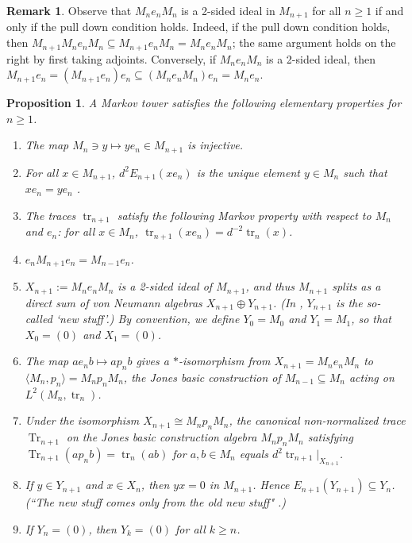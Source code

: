 \documentclass[11pt]{article}
\theoremstyle{plain}
\newtheorem{prop}[thm]{Proposition}
\theoremstyle{definition}
\newtheorem{rem}[thm]{Remark}
\DeclareMathOperator{\Tr}{Tr}
\DeclareMathOperator{\tr}{tr}
\begin{document}
\begin{rem}\label{pulldowniff}
Observe that $M_n e_n M_n$ is a 2-sided ideal in $M_{n+1}$ for all $n\geq 1$ if and only if the pull down condition holds. Indeed, if the pull down condition holds, then $M_{n+1} M_n e_n M_n \subseteq M_{n+1} e_n M_n = M_n e_n M_n$; the same argument holds on the right by first taking adjoints. Conversely, if $M_n e_n M_n$ is a 2-sided ideal, then $M_{n+1} e_n = (M_{n+1} e_n)e_n \subseteq (M_n e_n M_n) e_n = M_n e_n$.
\end{rem}

\begin{prop}\label{prop:ElementaryMarkov} A Markov tower satisfies the following elementary properties for $n\geq 1$.
\begin{enumerate}[label={\rm(EP\arabic*)}]
\item
\label{EP:Injective}
The map $M_{n}\ni y\mapsto ye_n \in M_{n+1}$ is injective.

\item
\label{EP:UniquePullDown}
For all $x\in M_{n+1}$, $d^{2}E_{n+1}(x e_n)$ is the unique element $y\in M_n$ such that $x e_n = ye_n$ \cite[Lem.~1.2]{MR860811}.

\item
\label{EP:MarkovTraces}
The traces $\tr_{n+1}$ satisfy the following \emph{Markov property} with respect to $M_n$ and $e_n$: for all $x\in M_n$, $\tr_{n+1}(xe_n) = d^{-2} \tr_n(x)$.

\item
\label{EP:CompressM_{n+1}}
$e_n M_{n+1}e_n = M_{n-1}e_n$.

\item
\label{EP:2SidedIdeal}
$X_{n+1}:=M_n e_n M_n$ is a 2-sided ideal of $M_{n+1}$, and thus $M_{n+1}$ splits as a direct sum of von Neumann algebras $X_{n+1}\oplus Y_{n+1}$.
(In \cite[Thm.~4.1.4 and Thm.~4.6.3]{MR999799}, $Y_{n+1}$ is the so-called `new stuff'.)
By convention, we define $Y_0 = M_0$ and $Y_1 = M_1$, so that $X_0 = (0)$ and $X_1 = (0)$.

\item
\label{EP:BasicContruction}
The map $ae_n b\mapsto ap_n b$ gives a $*$-isomorphism from $X_{n+1}=M_n e_n M_n$ to $\langle M_n , p_n\rangle=M_np_nM_n$, the Jones basic construction of $M_{n-1} \subseteq M_n$ acting on $L^2(M_n,\tr_n)$.

\item
\label{EP:OtherMarkovDef}
Under the isomorphism $X_{n+1} \cong M_n p_n M_n$, the canonical non-normalized trace $\Tr_{n+1}$ on the Jones basic construction algebra $M_np_nM_n$ satisfying $\Tr_{n+1}(ap_nb) = \tr_n(ab)$ for $a,b\in M_n$ equals $d^2 \tr_{n+1}|_{X_{n+1}}$.

\item
\label{EP:NewStuff}
If $y\in Y_{n+1}$ and $x\in X_{n}$, then $yx = 0$ in $M_{n+1}$.
Hence $E_{n+1}(Y_{n+1}) \subseteq Y_{n}$.
(``The new stuff comes only from the old new stuff" \cite{MR999799}.)

\item
\label{EP:FiniteDepth}
If $Y_n =(0)$, then $Y_{k} = (0)$ for all $k\geq n$.

\end{enumerate}
\end{prop}
\end{document}
